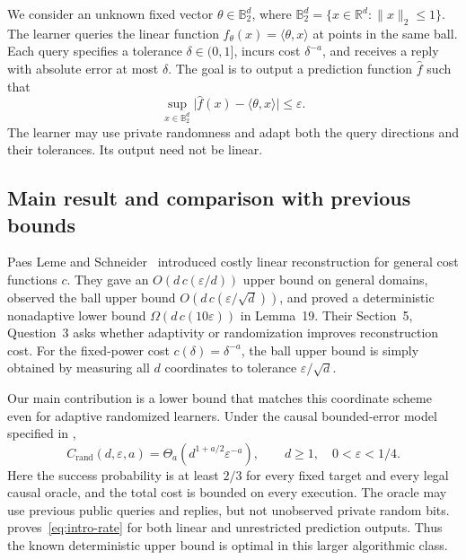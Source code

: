\documentclass[11pt,a4paper]{article}
\newcommand{\R}{\mathbb R}
\newcommand{\B}{\mathbb B}
\newcommand{\eps}{\varepsilon}
\newcommand{\ip}[2]{\langle #1,#2\rangle}
\newcommand{\norm}[1]{\lVert #1\rVert}
\newcommand{\abs}[1]{\lvert #1\rvert}
\newcommand{\Cr}{C_{\mathrm{rand}}}
\theoremstyle{definition}
\theoremstyle{remark}
\begin{document}
We consider an unknown fixed vector $\theta\in\B_2^d$, where
$\B_2^d=\{x\in\R^d:\norm{x}_2\le1\}$. The learner queries the linear function $f_\theta(x)=\ip{\theta}{x}$ at points in the same ball. Each query specifies a tolerance $\delta\in(0,1]$, incurs cost $\delta^{-a}$, and receives a reply with absolute error at most $\delta$. The goal is to output a prediction function $\widehat f$ such that
\begin{equation}\label{eq:intro-target}
 \sup_{x\in\B_2^d}\abs{\widehat f(x)-\ip{\theta}{x}}\le\eps.
\end{equation}
The learner may use private randomness and adapt both the query directions and their tolerances. Its output need not be linear.

\subsection{Main result and comparison with previous bounds}
Paes Leme and Schneider~\cite{Cost20} introduced costly linear reconstruction for general cost functions $c$. They gave an $O(d\,c(\eps/d))$ upper bound on general domains, observed the ball upper bound $O(d\,c(\eps/\sqrt d))$, and proved a deterministic nonadaptive lower bound $\Omega(d\,c(10\eps))$ in Lemma~19. Their Section~5, Question~3 asks whether adaptivity or randomization improves reconstruction cost. For the fixed-power cost $c(\delta)=\delta^{-a}$, the ball upper bound is simply obtained by measuring all $d$ coordinates to tolerance $\eps/\sqrt d$.

Our main contribution is a lower bound that matches this coordinate scheme even for adaptive randomized learners. Under the causal bounded-error model specified in ,
\begin{equation}\label{eq:intro-rate}
 \Cr(d,\eps,a)
 =\Theta_a\!\left(d^{1+a/2}\eps^{-a}\right),
 \qquad d\ge1,\quad 0<\eps<1/4.
\end{equation}
Here the success probability is at least $2/3$ for every fixed target and every legal causal oracle, and the total cost is bounded on every execution. The oracle may use previous public queries and replies, but not unobserved private random bits.  proves~\eqref{eq:intro-rate} for both linear and unrestricted prediction outputs. Thus the known deterministic upper bound is optimal in this larger algorithmic class.
\end{document}
